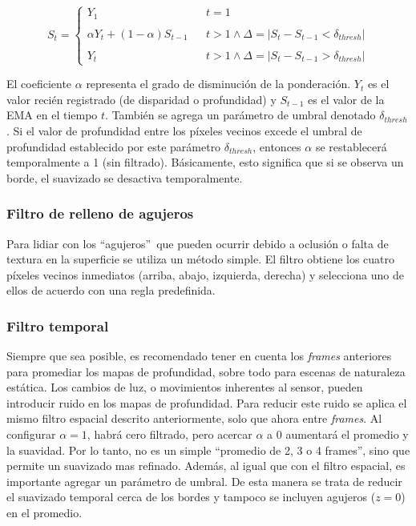 \begin{equation}
	S_t = \left\{ \begin{array}{lcc}
		Y_1 & &  t = 1\\
		\\ \alpha Y_t + (1-\alpha)S_{t-1} &  &t > 1 \wedge \Delta=|S_t - S_{t-1} < \delta_{thresh}|\\
		\\ Y_t & & t > 1 \wedge \Delta=|S_t - S_{t-1} > \delta_{thresh}|
	\end{array}
	\right.
\end{equation}

El coeficiente $\alpha$ representa el grado de disminución de la ponderación. $Y_t$ es el valor recién registrado (de disparidad o profundidad) y $S_{t-1}$ es el valor de la EMA en el tiempo $t$. También se agrega un parámetro de umbral denotado $\delta_{thresh}$. Si el valor de profundidad entre los píxeles vecinos excede el umbral de profundidad establecido por este parámetro $\delta_{thresh}$, entonces $\alpha$ se restablecerá temporalmente a 1 (sin filtrado). Básicamente, esto significa que si se observa un borde, el suavizado se desactiva temporalmente.


\subsubsection{Filtro de relleno de agujeros}

Para lidiar con los \textquotedblleft agujeros\textquotedblright\ que pueden ocurrir debido a oclusión o falta de textura en la superficie se utiliza un método simple. El filtro obtiene los cuatro píxeles vecinos inmediatos (arriba, abajo, izquierda, derecha) y selecciona uno de ellos de acuerdo con una regla predefinida.

\subsubsection{Filtro temporal}

Siempre que sea posible, es recomendado tener en cuenta los \textit{frames} anteriores para promediar los mapas de profundidad, sobre todo para escenas de naturaleza estática. Los cambios de luz, o movimientos inherentes al sensor, pueden introducir ruido en los mapas de profundidad. Para reducir este ruido se aplica el mismo filtro espacial descrito anteriormente, solo que ahora entre \textit{frames}. Al configurar $\alpha = 1$, habrá cero filtrado, pero acercar $\alpha$ a 0 aumentará el promedio y la suavidad. Por lo tanto, no es un simple ``promedio de 2, 3 o 4 frames'', sino que permite un suavizado mas refinado. Además, al igual que con el filtro espacial, es importante agregar un parámetro de umbral. De esta manera se trata de reducir el suavizado temporal cerca de los bordes y tampoco se incluyen agujeros ($z=0$) en el promedio.

